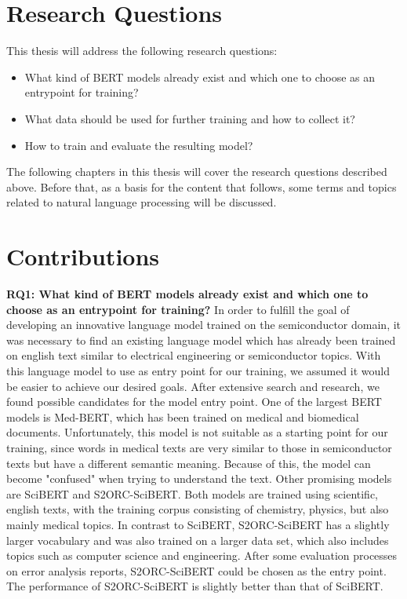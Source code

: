 \section{Research Questions}
This thesis will address the following research questions:
\begin{itemize}
	\item What kind of BERT models already exist and which one to choose as an entrypoint for training?
	\item What data should be used for further training and how to collect it?
	\item How to train and evaluate the resulting model?
\end{itemize}

The following chapters in this thesis will cover the research questions described above. Before that, as a basis for the content that follows, some terms and topics related to natural language processing will be discussed.

\section{Contributions}
\textbf{RQ1: What kind of BERT models already exist and which one to choose as an entrypoint for training?} \newline
In order to fulfill the goal of developing an innovative language model trained on the semiconductor domain, it was necessary to find an existing language model which has already been trained on english text similar to electrical engineering or semiconductor topics. With this language model to use as entry point for our training, we assumed it would be easier to achieve our desired goals. 
After extensive search and research, we found possible candidates for the model entry point. One of the largest BERT models is Med-BERT, which has been trained on medical and biomedical documents. Unfortunately, this model is not suitable as a starting point for our training, since words in medical texts are very similar to those in semiconductor texts but have a different semantic meaning. Because of this, the model can become "confused" when trying to understand the text. Other promising models are SciBERT and S2ORC-SciBERT. Both models are trained using scientific, english texts, with the training corpus consisting of chemistry, physics, but also mainly medical topics. In contrast to SciBERT, S2ORC-SciBERT has a slightly larger vocabulary and was also trained on a larger data set, which also includes topics such as computer science and engineering. \newline
After some evaluation processes on error analysis reports, S2ORC-SciBERT could be chosen as the entry point. The performance of S2ORC-SciBERT is slightly better than that of SciBERT.

